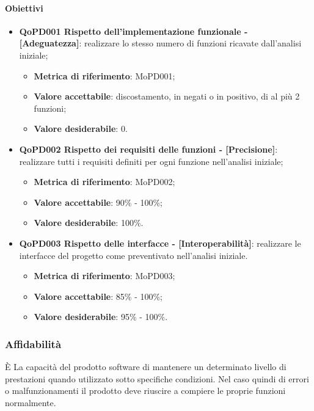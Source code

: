 \documentclass[../piano-di-qualifica.tex]{subfiles}
\begin{document}
\paragraph{Obiettivi}
\label{sub:obiettivi}
\begin{itemize}
    \item \textbf{QoPD001 Rispetto dell'implementazione funzionale - [Adeguatezza]}: realizzare lo stesso numero di funzioni ricavate dall'analisi iniziale;
        \begin{itemize}
            \item \textbf{Metrica di riferimento}: MoPD001;
            \item \textbf{Valore accettabile}: discostamento, in negati o in positivo, di al più 2 funzioni;
            \item \textbf{Valore desiderabile}: 0.
        \end{itemize}
    \item \textbf{QoPD002 Rispetto dei requisiti delle funzioni - [Precisione]}: realizzare tutti i requisiti definiti per ogni funzione nell'analisi iniziale;
        \begin{itemize}
            \item \textbf{Metrica di riferimento}: MoPD002;
            \item \textbf{Valore accettabile}: 90\% - 100\%;
            \item \textbf{Valore desiderabile}: 100\%.
        \end{itemize}
    \item \textbf{QoPD003 Rispetto delle interfacce - [Interoperabilità]}: realizzare le interfacce del progetto come preventivato nell'analisi iniziale.
        \begin{itemize}
            \item \textbf{Metrica di riferimento}: MoPD003;
            \item \textbf{Valore accettabile}: 85\% - 100\%;
            \item \textbf{Valore desiderabile}: 95\% - 100\%.
        \end{itemize}
\end{itemize}

\subsubsection{Affidabilità}%
\label{sub:affidabilita}
È La capacità del prodotto software di mantenere un determinato livello di prestazioni quando utilizzato sotto specifiche condizioni.
Nel caso quindi di errori o malfunzionamenti il prodotto deve riuscire a compiere le proprie funzioni normalmente.
\end{document}
